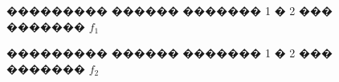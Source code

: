 \documentclass[a4paper]{article}
\begin{document}
\begin{figure}[h]
  \begin{minipage}[h]{0.9\linewidth}
  \end{minipage}
  \vfill
  \begin{minipage}[h]{0.9\linewidth}
  \end{minipage}
  \caption{��������� ������ ������� 1 � 2 ��� ������� $f_1$}
  \label{ris:image1}
\end{figure}

\begin{figure}[h]
  \begin{minipage}[h]{0.9\linewidth}
  \end{minipage}
  \vfill
  \begin{minipage}[h]{0.9\linewidth}
  \end{minipage}
  \caption{��������� ������ ������� 1 � 2 ��� ������� $f_2$}
  \label{ris:image1}
\end{figure}
\end{document}
